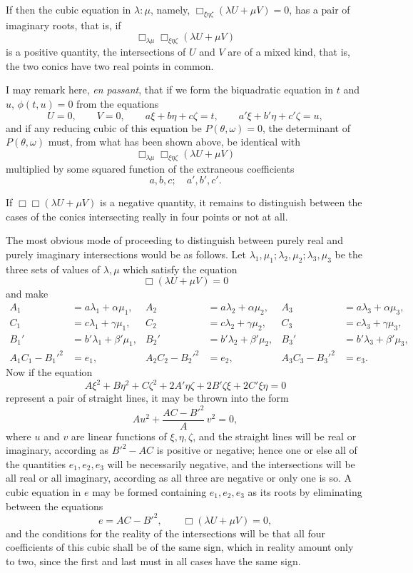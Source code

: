 \documentclass[11pt]{article}
\newcommand{\sourcepage}[1]{\marginpar{\scriptsize p.~#1}}
\begin{document}
If then the cubic equation in $\lambda:\mu$, namely, $\Box_{\xi\eta\zeta}(\lambda U+\mu V)=0$, has a pair of imaginary roots, that is, if
\[
\Box_{\lambda\mu}\Box_{\xi\eta\zeta}(\lambda U+\mu V)
\]
is a positive quantity, the intersections of $U$ and $V$ are of a mixed kind, that is, the two conics have two real points in common.

\sourcepage{121}
I may remark here, \emph{en passant}, that if we form the biquadratic equation in $t$ and $u$, $\phi(t,u)=0$ from the equations
\[
U=0,\qquad V=0,\qquad
a\xi+b\eta+c\zeta=t,\qquad
a'\xi+b'\eta+c'\zeta=u,
\]
and if any reducing cubic of this equation be $P(\theta,\omega)=0$, the determinant of $P(\theta,\omega)$ must, from what has been shown above, be identical with
\[
\Box_{\lambda\mu}\Box_{\xi\eta\zeta}(\lambda U+\mu V)
\]
multiplied by some squared function of the extraneous coefficients
\[
a,b,c;\quad a',b',c'.
\]

If $\Box\Box(\lambda U+\mu V)$ is a negative quantity, it remains to distinguish between the cases of the conics intersecting really in four points or not at all.

The most obvious mode of proceeding to distinguish between purely real and purely imaginary intersections would be as follows. Let $\lambda_1,\mu_1;\lambda_2,\mu_2;\lambda_3,\mu_3$ be the three sets of values of $\lambda,\mu$ which satisfy the equation
\[
\Box(\lambda U+\mu V)=0
\]
and make
\[
\begin{aligned}
A_1&=a\lambda_1+\alpha\mu_1,&
A_2&=a\lambda_2+\alpha\mu_2,&
A_3&=a\lambda_3+\alpha\mu_3,\\
C_1&=c\lambda_1+\gamma\mu_1,&
C_2&=c\lambda_2+\gamma\mu_2,&
C_3&=c\lambda_3+\gamma\mu_3,\\
B_1'&=b'\lambda_1+\beta'\mu_1,&
B_2'&=b'\lambda_2+\beta'\mu_2,&
B_3'&=b'\lambda_3+\beta'\mu_3,\\
A_1C_1-B_1'^2&=e_1,&
A_2C_2-B_2'^2&=e_2,&
A_3C_3-B_3'^2&=e_3.
\end{aligned}
\]
Now if the equation
\[
A\xi^2+B\eta^2+C\zeta^2+2A'\eta\zeta+2B'\zeta\xi+2C'\xi\eta=0
\]
represent a pair of straight lines, it may be thrown into the form
\[
Au^2+\frac{AC-B'^2}{A}\,v^2=0,
\]
where $u$ and $v$ are linear functions of $\xi,\eta,\zeta$, and the straight lines will be real or imaginary, according as $B'^2-AC$ is positive or negative; hence one or else all of the quantities $e_1,e_2,e_3$ will be necessarily negative, and the intersections will be all real or all imaginary, according as all three are negative or only one is so. A cubic equation in $e$ may be formed containing $e_1,e_2,e_3$ as its roots by eliminating between the equations
\[
e=AC-B'^2,\qquad \Box(\lambda U+\mu V)=0,
\]
and the conditions for the reality of the intersections will be that all four coefficients of this cubic shall be of the same sign, which in reality amount only to two, since the first and last must in all cases have the same sign.
\end{document}
